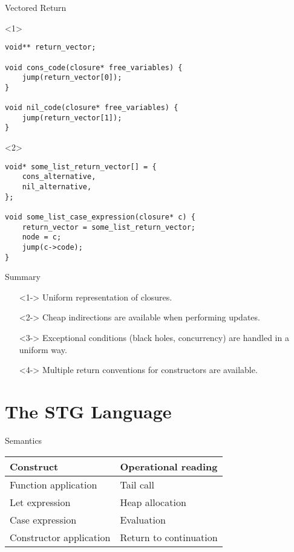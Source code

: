 \documentclass{beamer}
\begin{document}
\begin{frame}[fragile]{Vectored Return}
  \begin{onlyenv}<1>
    \begin{verbatim}
void** return_vector;

void cons_code(closure* free_variables) {
    jump(return_vector[0]);
}

void nil_code(closure* free_variables) {
    jump(return_vector[1]);
}
    \end{verbatim}
  \end{onlyenv}

  \begin{onlyenv}<2>
    \begin{verbatim}
void* some_list_return_vector[] = {
    cons_alternative,
    nil_alternative,
};

void some_list_case_expression(closure* c) {
    return_vector = some_list_return_vector;
    node = c;
    jump(c->code);
}
    \end{verbatim}
  \end{onlyenv}
\end{frame}

\begin{frame}{Summary}
  \begin{itemize}
  \item[]<1-> Uniform representation of closures.
  \item[]<2-> Cheap indirections are available when performing updates.
  \item[]<3-> Exceptional conditions (black holes, concurrency) are handled in a
    uniform way.
  \item[]<4-> Multiple return conventions for constructors are available.
  \end{itemize}
\end{frame}

\section{The STG Language}

\begin{frame}{Semantics}
  \begin{tabular}{ | l | l | }
    \hline
    Construct & Operational reading \\ \hline
    Function application & Tail call \\
    Let expression & Heap allocation \\
    Case expression & Evaluation \\
    Constructor application & Return to continuation \\
    \hline
  \end{tabular}
\end{frame}
\end{document}
